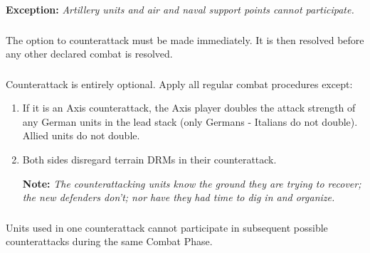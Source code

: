 \textbf{Exception:} \textit{Artillery units and air and naval support points cannot participate.}

\subsubsection{}
The option to counterattack must be made immediately. It is then resolved before any other declared combat is resolved.

\subsubsection{}
Counterattack is entirely optional. Apply all regular combat procedures except:

\begin{enumerate}[label=\alph*.]
    \item If it is an Axis counterattack, the Axis player doubles the attack strength of any German units in the lead stack (only Germans - Italians do not double). Allied units do not double.
    \item Both sides disregard terrain DRMs in their counterattack.

    \textbf{Note:} \textit{The counterattacking units know the ground they are trying to recover; the new defenders don't; nor have they had time to dig in and organize.}
\end{enumerate}

\subsubsection{}
Units used in one counterattack cannot participate in subsequent possible counterattacks during the same Combat Phase.